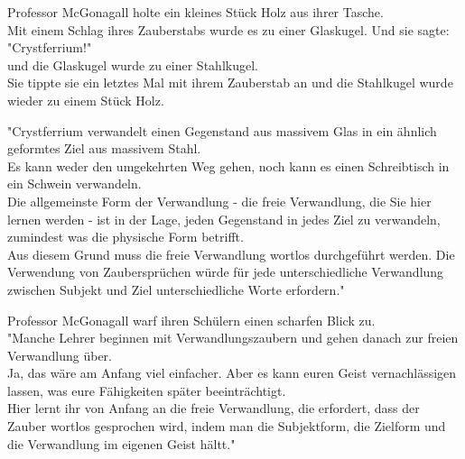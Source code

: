 {Professor McGonagall holte ein kleines Stück Holz aus ihrer Tasche.\\ Mit einem Schlag ihres Zauberstabs wurde es zu einer Glaskugel. Und sie sagte:\\ "Crystferrium!"\\ und die Glaskugel wurde zu einer Stahlkugel.\\ Sie tippte sie ein letztes Mal mit ihrem Zauberstab an und die Stahlkugel wurde wieder zu einem Stück Holz.

"Crystferrium verwandelt einen Gegenstand aus massivem Glas in ein ähnlich geformtes Ziel aus massivem Stahl.\\ Es kann weder den umgekehrten Weg gehen, noch kann es einen Schreibtisch in ein Schwein verwandeln.\\ Die allgemeinste Form der Verwandlung - die freie Verwandlung, die Sie hier lernen werden - ist in der Lage, jeden Gegenstand in jedes Ziel zu verwandeln, zumindest was die physische Form betrifft.\\ Aus diesem Grund muss die freie Verwandlung wortlos durchgeführt werden. Die Verwendung von Zaubersprüchen würde für jede unterschiedliche Verwandlung zwischen Subjekt und Ziel unterschiedliche Worte erfordern."

Professor McGonagall warf ihren Schülern einen scharfen Blick zu.\\ "Manche Lehrer beginnen mit Verwandlungszaubern und gehen danach zur freien Verwandlung über.\\ Ja, das wäre am Anfang viel einfacher. Aber es kann euren Geist vernachlässigen lassen, was eure Fähigkeiten später beeinträchtigt.\\ Hier lernt ihr von Anfang an die freie Verwandlung, die erfordert, dass der Zauber wortlos gesprochen wird, indem man die Subjektform, die Zielform und die Verwandlung im eigenen Geist hältt."

}
